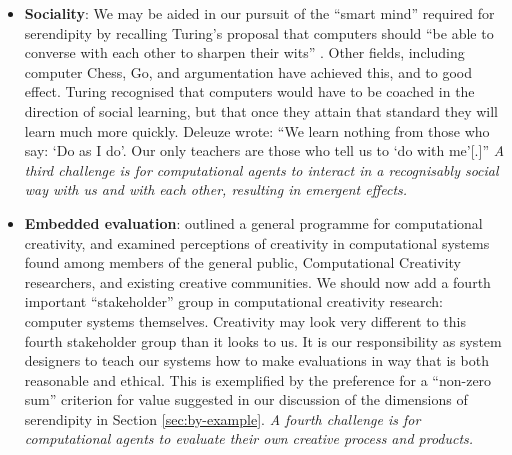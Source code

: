 \begin{itemize}
\item \textbf{Sociality}: We may be aided in our pursuit of the
  ``smart mind'' required for serendipity by recalling Turing's
  proposal that computers should ``be able to converse with each other
  to sharpen their wits'' \cite{turing-intelligent}.  Other fields,
  including computer Chess, Go, and argumentation have achieved this,
  and to good effect.  Turing recognised that computers would have to
  be coached in the direction of social learning, but that once they
  attain that standard they will learn much more quickly.  Deleuze
  \citeyear[p. 26]{deleuze1994difference} wrote: ``We learn nothing
  from those who say: `Do as I do'. Our only teachers are those who
  tell us to `do with me'[.]''  \emph{A third challenge is for
    computational agents to interact in a recognisably social way with
    us and with each other, resulting in emergent effects.}
\end{itemize}

\begin{itemize}
\item \textbf{Embedded evaluation}:
   outlined a general programme
  for computational creativity, and examined perceptions of creativity
  in computational systems found among members of the general public,
  Computational Creativity researchers, and existing creative
  communities.  We should now add a fourth important ``stakeholder''
  group in computational creativity research: computer systems
  themselves.  Creativity may look very different to this fourth
  stakeholder group than it looks to us.  It is our responsibility as
  system designers to teach our systems how to make
  evaluations in way that is both reasonable and ethical.  This is
  exemplified by the preference for a ``non-zero sum'' criterion for
  value suggested in our discussion of the dimensions of serendipity
  in Section \ref{sec:by-example}.  \emph{A fourth challenge is for
    computational agents to evaluate their own creative process and
    products.}
\end{itemize}



